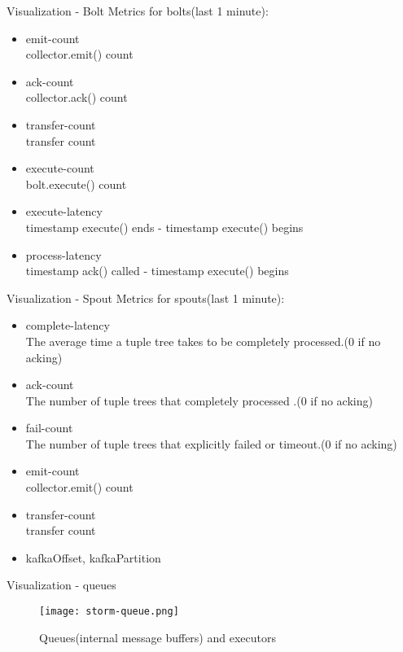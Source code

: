 \documentclass{beamer}
\begin{document}
\begin{frame}{Visualization - Bolt}
  Metrics for bolts(last 1 minute):
  \begin{itemize}
    \item emit-count\\
      collector.emit() count
    \item ack-count\\
      collector.ack() count
    \item transfer-count\\
      transfer count
    \item execute-count\\
      bolt.execute() count
    \item execute-latency\\
      timestamp execute() ends - timestamp execute() begins
    \item process-latency\\
      timestamp ack() called - timestamp execute() begins
  \end{itemize}
\end{frame}
\begin{frame}{Visualization - Spout}
  Metrics for spouts(last 1 minute):
  \begin{itemize}
    \item complete-latency\\
      The average time a tuple tree takes to be completely processed.(0 if no acking)
    \item ack-count\\
      The number of tuple trees that completely processed .(0 if no acking)
    \item fail-count\\
      The number of tuple trees that explicitly failed or timeout.(0 if no acking)
    \item emit-count\\
      collector.emit() count
    \item transfer-count\\
      transfer count
    \item kafkaOffset, kafkaPartition
  \end{itemize}
\end{frame}
\begin{frame}{Visualization - queues}
  \begin{figure}
    \centering
    \texttt{[image: storm-queue.png]}
    \caption{Queues(internal message buffers) and executors}
  \end{figure}
\end{frame}
\end{document}
